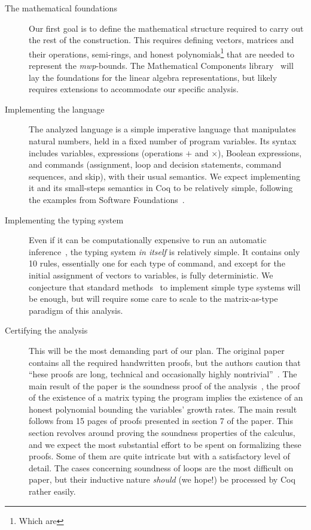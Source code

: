 \begin{description}
\item[The mathematical foundations]
Our first goal is to define the mathematical structure required to carry out the rest of the construction.
This requires defining vectors, matrices and their operations, semi-rings, and honest polynomials\footnote{Which are } that are
needed to represent the \emph{mwp}-bounds.
The Mathematical Components library~\cite{mahboubi2022} will lay the foundations for the linear algebra representations,
but likely requires extensions to accommodate our specific analysis.

\item[Implementing the language]
The analyzed language is a simple imperative language that manipulates natural numbers,
held in a fixed number of program variables. Its syntax includes
variables, expressions (operations $+$ and $\times$), Boolean expressions, and commands (\eg  assignment, loop and decision statements, command sequences, and skip), with their usual semantics.
We expect implementing it and its small-steps semantics in Coq to be relatively simple,
following the examples from Software Foundations~\cite{cpierce20221,cpierce20222}.

\item[Implementing the typing system]
Even if it can be computationally expensive to run an automatic inference~\cite{aubert2023b}, the typing system \emph{in itself} is relatively simple.
It contains only 10 rules, essentially one for each type of command, and except for the initial assignment of vectors to variables, is fully deterministic.
We conjecture that standard methods~\cite{chlipala2022, chlipala2010} to implement simple type systems will be enough, but will require some care to scale to the matrix-as-type paradigm of this analysis.

\item[Certifying the analysis]
This will be the most demanding part of our plan.
The original paper contains all the required handwritten proofs, but the authors caution that \enquote{hese proofs are long, technical and occasionally highly nontrivial}~\cite[p.~2]{jones2009}.
The main result of the paper is the soundness proof of the analysis~\cite[Theorem 5.3]{jones2009},
\ie the proof of the existence of a matrix typing the program implies the existence of an honest polynomial bounding the variables' growth rates.
The main result follows from 15 pages of proofs presented in section 7 of the paper.
This section revolves around proving the soundness properties of the calculus,
and we expect the most substantial effort to be spent on formalizing these proofs.
Some of them are quite intricate but with a satisfactory level of detail.
The cases concerning soundness of loops are the most difficult on paper, but their inductive nature \emph{should} (we hope!) be processed by Coq rather easily.%
\end{description}

